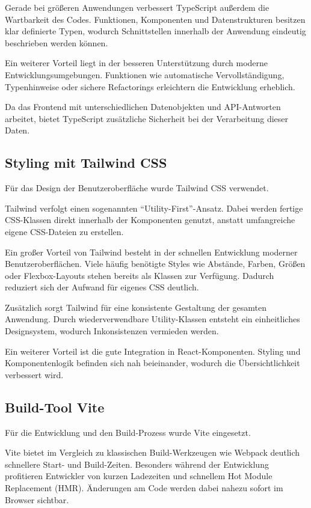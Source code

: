 Gerade bei größeren Anwendungen verbessert TypeScript außerdem die Wartbarkeit des Codes. Funktionen, Komponenten und Datenstrukturen besitzen klar definierte Typen, wodurch Schnittstellen innerhalb der Anwendung eindeutig beschrieben werden können.

Ein weiterer Vorteil liegt in der besseren Unterstützung durch moderne Entwicklungsumgebungen. Funktionen wie automatische Vervollständigung, Typenhinweise oder sichere Refactorings erleichtern die Entwicklung erheblich.

Da das Frontend mit unterschiedlichen Datenobjekten und API-Antworten arbeitet, bietet TypeScript zusätzliche Sicherheit bei der Verarbeitung dieser Daten.

\subsection{Styling mit Tailwind CSS}
Für das Design der Benutzeroberfläche wurde Tailwind CSS verwendet.

Tailwind verfolgt einen sogenannten \enquote{Utility-First}-Ansatz. Dabei werden fertige CSS-Klassen direkt innerhalb der Komponenten genutzt, anstatt umfangreiche eigene CSS-Dateien zu erstellen.

Ein großer Vorteil von Tailwind besteht in der schnellen Entwicklung moderner Benutzeroberflächen. Viele häufig benötigte Styles wie Abstände, Farben, Größen oder Flexbox-Layouts stehen bereits als Klassen zur Verfügung. Dadurch reduziert sich der Aufwand für eigenes CSS deutlich.

Zusätzlich sorgt Tailwind für eine konsistente Gestaltung der gesamten Anwendung. Durch wiederverwendbare Utility-Klassen entsteht ein einheitliches Designsystem, wodurch Inkonsistenzen vermieden werden.

Ein weiterer Vorteil ist die gute Integration in React-Komponenten. Styling und Komponentenlogik befinden sich nah beieinander, wodurch die Übersichtlichkeit verbessert wird.

\subsection{Build-Tool Vite}
Für die Entwicklung und den Build-Prozess wurde Vite eingesetzt.

Vite bietet im Vergleich zu klassischen Build-Werkzeugen wie Webpack deutlich schnellere Start- und Build-Zeiten. Besonders während der Entwicklung profitieren Entwickler von kurzen Ladezeiten und schnellem Hot Module Replacement (HMR). Änderungen am Code werden dabei nahezu sofort im Browser sichtbar.

